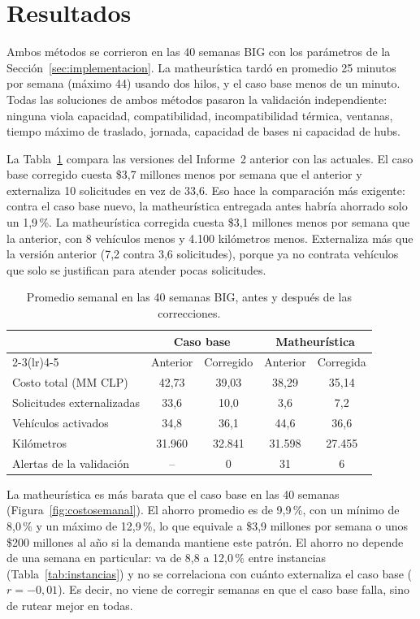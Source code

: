 \section{Resultados}\label{sec:resultados}

Ambos métodos se corrieron en las 40 semanas BIG con los parámetros de la Sección~\ref{sec:implementacion}. La matheurística tardó en promedio 25 minutos por semana (máximo 44) usando dos hilos, y el caso base menos de un minuto. Todas las soluciones de ambos métodos pasaron la validación independiente: ninguna viola capacidad, compatibilidad, incompatibilidad térmica, ventanas, tiempo máximo de traslado, jornada, capacidad de bases ni capacidad de hubs.

 La Tabla~\ref{tab:evolucion} compara las versiones del Informe~2 anterior con las actuales. El caso base corregido cuesta \$3,7 millones menos por semana que el anterior y externaliza 10 solicitudes en vez de 33,6. Eso hace la comparación más exigente: contra el caso base nuevo, la matheurística entregada antes habría ahorrado solo un 1,9\,\%. La matheurística corregida cuesta \$3,1 millones menos por semana que la anterior, con 8 vehículos menos y 4.100 kilómetros menos. Externaliza más que la versión anterior (7,2 contra 3,6 solicitudes), porque ya no contrata vehículos que solo se justifican para atender pocas solicitudes.

\begin{table}[htbp]
\centering
\caption{Promedio semanal en las 40 semanas BIG, antes y después de las correcciones.}\label{tab:evolucion}
\small
\begin{tabular}{lcccc}
\toprule
 & \multicolumn{2}{c}{Caso base} & \multicolumn{2}{c}{Matheurística} \\
\cmidrule(lr){2-3}\cmidrule(lr){4-5}
 & Anterior & Corregido & Anterior & Corregida \\
\midrule
Costo total (MM CLP) & 42,73 & 39,03 & 38,29 & 35,14 \\
Solicitudes externalizadas & 33,6 & 10,0 & 3,6 & 7,2 \\
Vehículos activados & 34,8 & 36,1 & 44,6 & 36,6 \\
Kilómetros & 31.960 & 32.841 & 31.598 & 27.455 \\
Alertas de la validación & -- & 0 & 31 & 6 \\
\bottomrule
\end{tabular}
\end{table}

 La matheurística es más barata que el caso base en las 40 semanas (Figura~\ref{fig:costosemanal}). El ahorro promedio es de 9,9\,\%, con un mínimo de 8,0\,\% y un máximo de 12,9\,\%, lo que equivale a \$3,9 millones por semana o unos \$200 millones al año si la demanda mantiene este patrón. El ahorro no depende de una semana en particular: va de 8,8 a 12,0\,\% entre instancias (Tabla~\ref{tab:instancias}) y no se correlaciona con cuánto externaliza el caso base ($r=-0{,}01$). Es decir, no viene de corregir semanas en que el caso base falla, sino de rutear mejor en todas.

